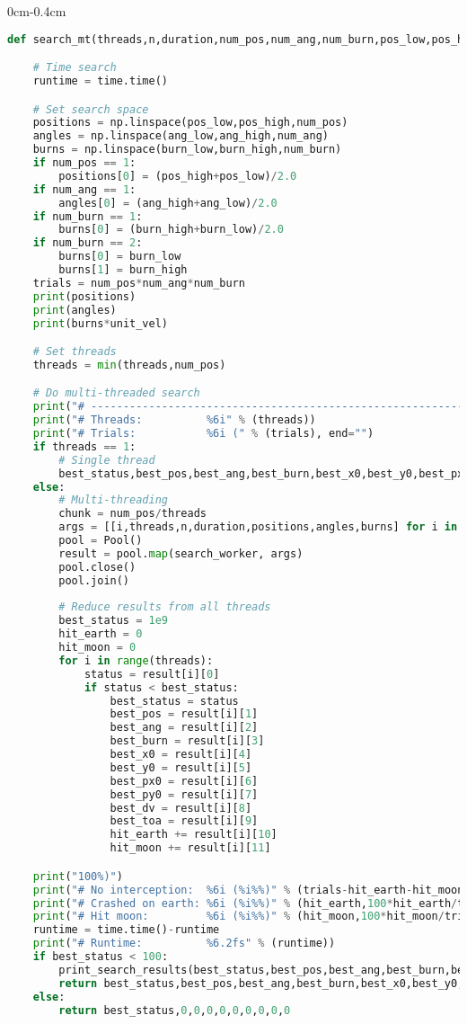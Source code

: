 \begin{adjustwidth*}{0cm}{-0.4cm}
\begin{lstlisting}[language=Python]
def search_mt(threads,n,duration,num_pos,num_ang,num_burn,pos_low,pos_high,ang_low,ang_high,burn_low,burn_high):

    # Time search
    runtime = time.time()

    # Set search space
    positions = np.linspace(pos_low,pos_high,num_pos)
    angles = np.linspace(ang_low,ang_high,num_ang)
    burns = np.linspace(burn_low,burn_high,num_burn)
    if num_pos == 1:
        positions[0] = (pos_high+pos_low)/2.0
    if num_ang == 1:
        angles[0] = (ang_high+ang_low)/2.0
    if num_burn == 1:
        burns[0] = (burn_high+burn_low)/2.0
    if num_burn == 2:
        burns[0] = burn_low
        burns[1] = burn_high
    trials = num_pos*num_ang*num_burn
    print(positions)
    print(angles)
    print(burns*unit_vel)

    # Set threads
    threads = min(threads,num_pos)

    # Do multi-threaded search
    print("# --------------------------------------------------------------------------")
    print("# Threads:          %6i" % (threads))
    print("# Trials:           %6i (" % (trials), end="")
    if threads == 1:
        # Single thread
        best_status,best_pos,best_ang,best_burn,best_x0,best_y0,best_px0,best_py0,best_dv,best_toa,hit_earth,hit_moon = search(0,num_pos,n,duration,positions,angles,burns)
    else:
        # Multi-threading
        chunk = num_pos/threads
        args = [[i,threads,n,duration,positions,angles,burns] for i in range(threads)]
        pool = Pool()
        result = pool.map(search_worker, args)
        pool.close()
        pool.join()
        
        # Reduce results from all threads
        best_status = 1e9
        hit_earth = 0
        hit_moon = 0
        for i in range(threads):
            status = result[i][0]
            if status < best_status:
                best_status = status
                best_pos = result[i][1]
                best_ang = result[i][2]
                best_burn = result[i][3]
                best_x0 = result[i][4]
                best_y0 = result[i][5]
                best_px0 = result[i][6]
                best_py0 = result[i][7]
                best_dv = result[i][8]
                best_toa = result[i][9]
                hit_earth += result[i][10]
                hit_moon += result[i][11]

    print("100%)")
    print("# No interception:  %6i (%i%%)" % (trials-hit_earth-hit_moon,100*(trials-hit_earth-hit_moon)/trials))
    print("# Crashed on earth: %6i (%i%%)" % (hit_earth,100*hit_earth/trials))
    print("# Hit moon:         %6i (%i%%)" % (hit_moon,100*hit_moon/trials))
    runtime = time.time()-runtime
    print("# Runtime:          %6.2fs" % (runtime))
    if best_status < 100:
        print_search_results(best_status,best_pos,best_ang,best_burn,best_x0,best_y0,best_px0,best_py0,best_dv,best_toa)
        return best_status,best_pos,best_ang,best_burn,best_x0,best_y0,best_px0,best_py0,best_dv,best_toa
    else:
        return best_status,0,0,0,0,0,0,0,0,0
\end{lstlisting}
\end{adjustwidth*}

